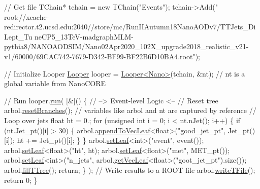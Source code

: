 \begin{DoxyEnumerate}
\begin{DoxyCode}
    \textcolor{comment}{// Get file}
    TChain* tchain = \textcolor{keyword}{new} TChain(\textcolor{stringliteral}{"Events"}); 
    tchain->Add(\textcolor{stringliteral}{"
      root://xcache-redirector.t2.ucsd.edu:2040//store/mc/RunIIAutumn18NanoAODv7/TTJets\_DiLept\_Tu
      neCP5\_13TeV-madgraphMLM-pythia8/NANOAODSIM/Nano02Apr2020\_102X\_upgrade2018\_realistic\_v21-v1/60000/69CAC742-7679-D342-BF99-BF22B6D10BA4.root"});

    \textcolor{comment}{// Initialize Looper}
    \hyperlink{classLooper}{Looper} looper = \hyperlink{classLooper}{Looper<Nano>}(tchain, &nt); \textcolor{comment}{// nt is a global variable from NanoCORE}

    \textcolor{comment}{// Run}
    looper.\hyperlink{classLooper_abfa564ca48778da1f58c8a6444ddd463}{run}(
        [&]()
        \{
            \textcolor{comment}{// --> Event-level Logic <--}
            \textcolor{comment}{// Reset tree}
            arbol.\hyperlink{classArbol_a4c2184d378ab21a9627a57098291a7c4}{resetBranches}(); \textcolor{comment}{// variables like arbol and nt are captured by reference}
            \textcolor{comment}{// Loop over jets}
            \textcolor{keywordtype}{float} ht = 0.;
            \textcolor{keywordflow}{for} (\textcolor{keywordtype}{unsigned} \textcolor{keywordtype}{int} i = 0; i < nt.nJet(); i++) 
            \{
                \textcolor{keywordflow}{if} (nt.Jet\_pt()[i] > 30)
                \{
                    arbol.\hyperlink{classArbol_a811156c9134ca7e0015bbe2ab95434b0}{appendToVecLeaf}<\textcolor{keywordtype}{float}>(\textcolor{stringliteral}{"good\_jet\_pt"}, Jet\_pt()[i]);
                    ht += Jet\_pt()[i];
                \}
            \}
            arbol.\hyperlink{classArbol_a7a8d3bec0bf5c00635a0b00fcd63cf01}{setLeaf}<\textcolor{keywordtype}{int}>(\textcolor{stringliteral}{"event"}, event());
            arbol.\hyperlink{classArbol_a7a8d3bec0bf5c00635a0b00fcd63cf01}{setLeaf}<\textcolor{keywordtype}{float}>(\textcolor{stringliteral}{"ht"}, ht);
            arbol.\hyperlink{classArbol_a7a8d3bec0bf5c00635a0b00fcd63cf01}{setLeaf}<\textcolor{keywordtype}{float}>(\textcolor{stringliteral}{"met"}, MET\_pt());
            arbol.\hyperlink{classArbol_a7a8d3bec0bf5c00635a0b00fcd63cf01}{setLeaf}<\textcolor{keywordtype}{int}>(\textcolor{stringliteral}{"n\_jets"}, arbol.\hyperlink{classArbol_a634be85d92f5f26403407952b10a29fd}{getVecLeaf}<\textcolor{keywordtype}{float}>(\textcolor{stringliteral}{"goot\_jet\_pt"}).size());
            arbol.\hyperlink{classArbol_a1d029dd97a0451281c774b578d93bcda}{fillTTree}();
            \textcolor{keywordflow}{return};
        \}
    );
    \textcolor{comment}{// Write results to a ROOT file}
    arbol.\hyperlink{classArbol_ade7d835bbe383a70006e86785ae5672c}{writeTFile}();
    \textcolor{keywordflow}{return} 0;
\}
\end{DoxyCode}


\end{DoxyEnumerate}
